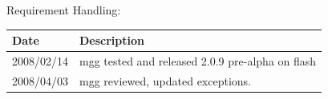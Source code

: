 \vspace{24pt}

Requirement Handling:

\begin{tabular}{|p{72pt}|p{351pt}|} \hline
Date & Description \\ \hline
2008/02/14 & mgg tested and released 2.0.9 pre-alpha on flash \\
\hline 
2008/04/03 & mgg reviewed, updated exceptions. \\ \hline 
\end{tabular}
